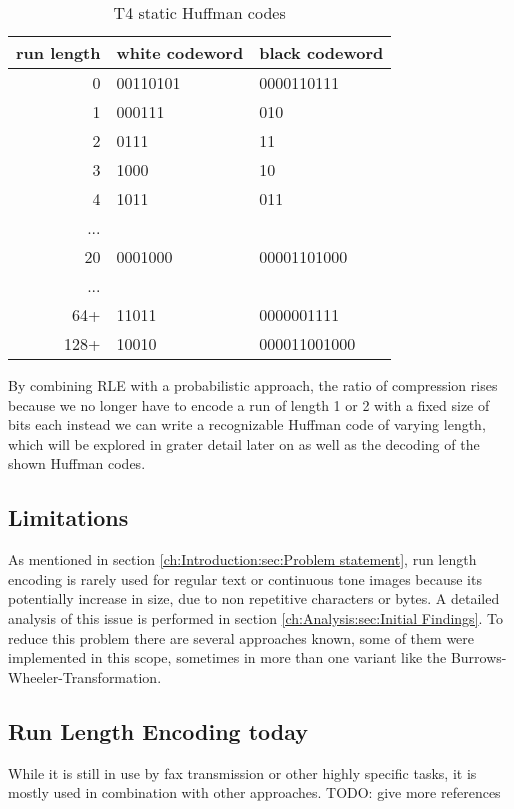 \begin{table}
	\centering
	\begin{tabular}[p]{r|l|l}
		run length &  white codeword & black codeword\\
		\hline
		0 &  00110101 & 0000110111\\
		1 & 000111 & 010\\
		2 & 0111 & 11\\
		3 & 1000 & 10\\
		4 & 1011 & 011\\
		... &  & \\
		20 & 0001000 & 00001101000\\
		... & & \\
		64+ & 11011 & 0000001111\\
		128+ & 10010 & 000011001000
		\label{tab:t1:static huffman codes}
	\end{tabular}
	\caption{T4 static Huffman codes}
\end{table}
\par{
By combining RLE with a probabilistic approach, the ratio of compression rises because we no longer have to encode a run of length 1 or 2 with a fixed size of bits each instead we can write a recognizable Huffman code of varying length, which will be explored in grater detail later on as well as the decoding of the shown Huffman codes.}

\subsection{Limitations}
\par{
As mentioned in section \ref{ch:Introduction:sec:Problem statement}, run length encoding is rarely used for regular text or continuous tone images because its potentially increase in size, due to non repetitive characters or bytes. A detailed analysis of this issue is performed in section \ref{ch:Analysis:sec:Initial Findings}. To reduce this problem there are several approaches known, some of them were implemented in this scope, sometimes in more than one variant like the Burrows-Wheeler-Transformation.
}

\subsection{Run Length Encoding today}
\par{
While it is still in use by fax transmission or other highly specific tasks, it is mostly used in combination with other approaches.
TODO: give more references  \cite{rle-dna}
}
